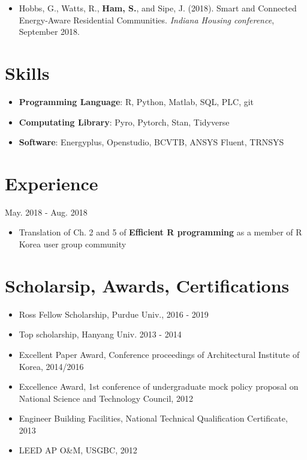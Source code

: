 \documentclass{resume}
\begin{document}
\begin{itemize}\setlength\itemsep{0.5em}\setlength\itemindent{-.1in}
\item{Hobbs, G., Watts, R., \textbf{Ham, S.}, and Sipe, J. (2018). Smart and Connected Energy-Aware Residential Communities. \textit{Indiana Housing conference}, September 2018. }
\end{itemize}

\section{Skills}
\begin{itemize}
\item \textbf{Programming Language}: {R, Python, Matlab, SQL, PLC, git}
\item \textbf{Computating Library}: {Pyro, Pytorch, Stan, Tidyverse}
\item \textbf{Software}: {Energyplus, Openstudio, BCVTB, ANSYS Fluent, TRNSYS}
\end{itemize}

\section{Experience}
 {\hfill   May. 2018 - Aug. 2018}
\begin{itemize}
\item{Translation of Ch. 2 and 5 of \textbf{Efficient R programming} as a member of R Korea user group community}
\end{itemize}

\section{Scholarsip, Awards, Certifications}
\begin{itemize}
\item{Ross Fellow Scholarship, Purdue Univ., 2016 - 2019}
\item{Top scholarship, Hanyang Univ. 2013 - 2014}
\end{itemize}
\begin{itemize}
\item{Excellent Paper Award, Conference proceedings of Architectural Institute of Korea, 2014/2016}
\item{Excellence Award, 1st conference of undergraduate mock policy proposal on National Science and Technology Council, 2012}
\end{itemize}
\begin{itemize}
\item{Engineer Building Facilities, National Technical Qualification Certificate, 2013}
\item{LEED AP O&M, USGBC, 2012}
\end{itemize}
\end{document}
